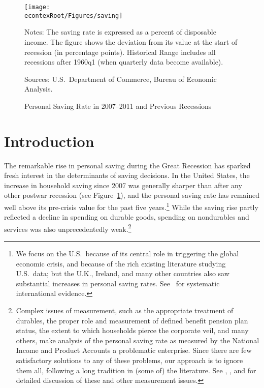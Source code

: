 \documentclass[titlepage]{\econtex}
\begin{document}
\titlepagefinish

\setcounter{page}{1}

\begin{figure}
\caption{Personal Saving Rate in 2007--2011 and Previous Recessions}
\label{fSRrec}
\texttt{[image: \\econtexRoot/Figures/saving]}

\footnotesize Notes: The saving rate is expressed as a percent of disposable income. The figure shows the deviation from its value at the start of recession (in percentage points). Historical Range includes all recessions after 1960q1 (when quarterly data become available).

\tiny Sources: U.S.\ Department of Commerce, Bureau of Economic Analysis.
\end{figure}

\section{Introduction}
 

The remarkable rise in personal saving during the Great Recession has sparked fresh interest in the determinants of saving decisions.  In the United States, the increase in household saving since 2007 was generally sharper than after any other postwar recession (see Figure~\ref{fSRrec}), and the personal saving rate has remained well above its pre-crisis value for the past five years.\footnote{We focus on the U.S.\ because of its central role in triggering the global economic crisis, and because of the rich existing literature studying U.S.\ data; but the U.K., Ireland, and many other countries also saw substantial increases in personal saving rates.  See~\cite{mosPSinGR} for systematic international evidence.}  While the saving rise partly reflected a decline in spending on durable goods, spending on nondurables and services was also unprecedentedly weak.\footnote{Complex issues of measurement, such as the appropriate treatment of durables, the proper role and measurement of defined benefit pension plan status, the extent to which households pierce the corporate veil, and many others, make analysis of the personal saving rate as measured by the National Income and Product Accounts a problematic enterprise.  Since there are few satisfactory solutions to any of these problems, our approach is to ignore them all, following a long tradition in (some of) the literature.  See \cite{kmitchSaving}, \cite{prSaving}, and \cite{CBOSaving} for detailed discussion of these and other measurement issues.}
\end{document}
